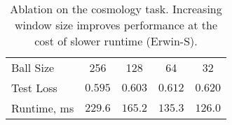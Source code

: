 \begin{table}
\vspace{-5pt}
\caption{Ablation on the cosmology task. Increasing window size improves performance at the cost of slower runtime (Erwin-S).}
\label{table:ablation_ball_size}
\begin{center}
\begin{small}
\begin{sc}
\begin{tabular}{lcccc}
\toprule
Ball Size & 256 & 128 & 64 & 32 \\
Test Loss & $\mathbf{0.595}$ & $0.603$ & $0.612$ & $0.620$ \\
Runtime, ms & $229.6$ & $165.2$ & $135.3$ & $\mathbf{126.0}$ \\
\bottomrule
\end{tabular}
\vspace{-10pt}
\end{sc}
\end{small}
\end{center}
\end{table}
